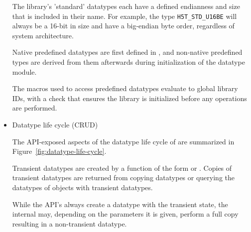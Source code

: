 \begin{itemize}
The library's 'standard' datatypes each have a defined endianness and size that is included in their name. For example, the type \texttt{H5T\_STD\_U16BE} will always be a 16-bit in size and have a big-endian byte order, regardless of system architecture.

Native predefined datatypes are first defined in , and non-native predefined types are derived from them afterwards during initialization of the datatype module.

The macros used to access predefined datatypes evaluate to global library IDs, with a check that ensures the library is initialized before any operations are performed.



    \item Datatype life cycle (CRUD)

The API-exposed aspects of the datatype life cycle of are summarized in Figure~\ref{fig:datatype-life-cycle}.

Transient datatypes are created by a function of the form  or . Copies of transient datatypes are returned from copying datatypes or querying the datatypes of objects with transient datatypes.

While the API's  always create a datatype with the transient state, the internal  may, depending on the parameters it is given, perform a full copy resulting in a non-transient datatype.


\end{itemize}
